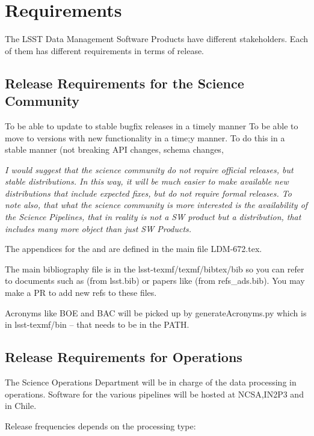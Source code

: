 \section{Requirements} \label{sec:reqs}

The LSST Data Management Software Products have different stakeholders.
Each of them has different requirements in terms of release.


\subsection{Release Requirements for the Science Community } \label{sec:comreqs}

To be able to update to stable bugfix releases in a timely manner
To be able to move to versions with new functionality in a time;y manner.
To do this in a stable manner (not breaking API changes, schema changes,

\textit{ I would suggest that the science community do not require official releases, but stable distributions.
In this way, it will be much easier to make available new distributions that include expected fixes,
but do not require formal releases.
To note also, that what the science community is more interested is the availability of the Science Pipelines,
that in reality is not a SW product but a distribution, that includes many more object than just SW Products.  }

The appendices for the  and  are defined in the main file LDM-672.tex.

The main bibliography file is in the lsst-texmf/texmf/bibtex/bib so you can refer
to documents such as  (from lsst.bib)  or papers like \cite{2008arXiv0805.2366I} (from refs\_ads.bib). You may make a PR to add new refs to these files.

Acronyms like BOE and BAC will be picked up by generateAcronyms.py which is in lsst-texmf/bin -- that needs to be in the PATH.


\subsection{Release Requirements for Operations} \label{sec:procreqs}

The Science Operations Department will be  in charge  of the data processing in operations. Software for the various pipelines
will be hosted at NCSA,IN2P3 and in Chile.

Release frequencies depends on the processing type:

